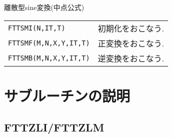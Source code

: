 \documentclass[a4j]{jarticle}
\begin{document}
 \vspace{1em}
  離散型sine変換(中点公式)

  \vspace{1em}
  \begin{tabular}{p{7cm}p{10cm}}
    {\tt FTTSMI(N,IT,T)} & 初期化をおこなう. \\
    {\tt FTTSMF(M,N,X,Y,IT,T)} & 正変換をおこなう. \\
    {\tt FTTSMB(M,N,X,Y,IT,T)} & 逆変換をおこなう.
  \end{tabular}
  
\newpage  
\section{サブルーチンの説明}

\subsection{FTTZLI/FTTZLM}
\end{document}
